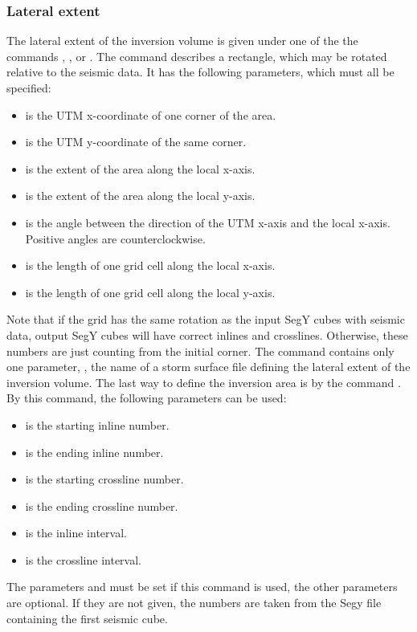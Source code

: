 \subsubsection{Lateral extent}
The lateral extent of the inversion volume is given under one of the
the commands ,
, or
. The
command  describes a rectangle, which may be
rotated relative to the seismic data. It has the following parameters,
which must all be specified: 
\begin{itemize}
\item {} is the UTM x-coordinate of one corner of the area.
\item {} is the UTM y-coordinate of the same corner.
\item {} is the extent of the area along the local x-axis.
\item {} is the extent of the area along the local y-axis.
\item {} is the angle between the direction of the UTM x-axis and the local x-axis. Positive angles are counterclockwise.
\item {} is the length of one grid cell along the local x-axis.
\item {} is the length of one grid cell along the local y-axis.
\end{itemize}
Note that if the grid has the same rotation as the input SegY cubes with seismic data, output SegY cubes will have correct inlines and crosslines. Otherwise, these numbers are just counting from the initial corner.
The command  contains only one parameter, , the name of a storm surface file defining the lateral extent of the inversion volume.
The last way to define the inversion area is by the command . By this command, the following parameters can be used:
\begin{itemize}
\item {} is the starting inline number.
\item {} is the ending inline number.
\item {} is the starting crossline number.
\item {} is the ending crossline number.
\item {} is the inline interval.
\item {} is the crossline interval.
\end{itemize}
The parameters  and  must be set if this command is used, the other parameters are optional. If they are not given, the numbers are taken from the Segy file containing the first seismic cube.

